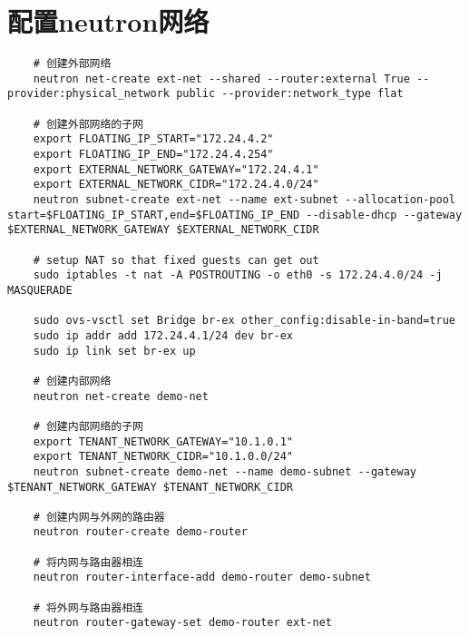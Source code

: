 \documentclass[a4paper,left=1.5cm,right=1.5cm,11pt]{article}
\begin{document}
\section{配置neutron网络}
	\begin{lstlisting}
	# 创建外部网络
	neutron net-create ext-net --shared --router:external True --provider:physical_network public --provider:network_type flat

	# 创建外部网络的子网
	export FLOATING_IP_START="172.24.4.2"
	export FLOATING_IP_END="172.24.4.254"
	export EXTERNAL_NETWORK_GATEWAY="172.24.4.1"
	export EXTERNAL_NETWORK_CIDR="172.24.4.0/24"
	neutron subnet-create ext-net --name ext-subnet --allocation-pool start=$FLOATING_IP_START,end=$FLOATING_IP_END --disable-dhcp --gateway $EXTERNAL_NETWORK_GATEWAY $EXTERNAL_NETWORK_CIDR

	# setup NAT so that fixed guests can get out
	sudo iptables -t nat -A POSTROUTING -o eth0 -s 172.24.4.0/24 -j MASQUERADE

	sudo ovs-vsctl set Bridge br-ex other_config:disable-in-band=true
	sudo ip addr add 172.24.4.1/24 dev br-ex
	sudo ip link set br-ex up

	# 创建内部网络
	neutron net-create demo-net

	# 创建内部网络的子网
	export TENANT_NETWORK_GATEWAY="10.1.0.1"
	export TENANT_NETWORK_CIDR="10.1.0.0/24"
	neutron subnet-create demo-net --name demo-subnet --gateway $TENANT_NETWORK_GATEWAY $TENANT_NETWORK_CIDR

	# 创建内网与外网的路由器
	neutron router-create demo-router

	# 将内网与路由器相连
	neutron router-interface-add demo-router demo-subnet

	# 将外网与路由器相连
	neutron router-gateway-set demo-router ext-net
	\end{lstlisting}
\end{document}
